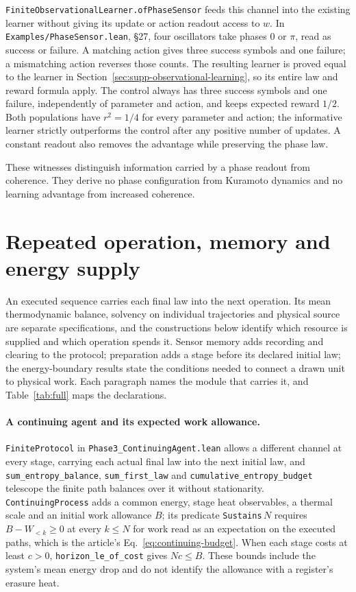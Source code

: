\documentclass{article}
\begin{document}
\texttt{FiniteObservationalLearner.ofPhaseSensor} feeds this channel into the
existing learner without giving its update or action readout access to $w$.
In \nolinkurl{Examples/PhaseSensor.lean}, \S27, four oscillators take
phases $0$ or $\pi$, read as success or failure. A matching action gives three
success symbols and one failure; a mismatching action reverses those counts.
The resulting learner is proved equal to the learner in
Section~\ref{sec:supp-observational-learning}, so its entire law and reward
formula apply. The control always has three success symbols and one failure,
independently of parameter and action, and keeps expected reward $1/2$.
Both populations have $r^2=1/4$ for every parameter and action; the informative
learner strictly outperforms the control after any positive number of updates.
A constant readout also removes the advantage while preserving the phase law.

These witnesses distinguish information carried by a phase readout from
coherence. They derive no phase configuration from Kuramoto dynamics and no
learning advantage from increased coherence.

\section{Repeated operation, memory and energy supply}
\label{sec:supp-resources}

An executed sequence carries each final law into the next operation. Its mean thermodynamic balance, solvency on individual trajectories and physical source are separate specifications, and the constructions below identify which resource is supplied and which operation spends it. Sensor memory adds recording and clearing to the protocol; preparation adds a stage before its declared initial law; the energy-boundary results state the conditions needed to connect a drawn unit to physical work. Each paragraph names the module that carries it, and Table~\ref{tab:full} maps the declarations.

\paragraph{A continuing agent and its expected work allowance.}
\texttt{FiniteProtocol} in \nolinkurl{Phase3_ContinuingAgent.lean}
allows a different channel at every stage, carrying each actual final law into
the next initial law, and \nolinkurl{sum_entropy_balance},
\nolinkurl{sum_first_law} and
\nolinkurl{cumulative_entropy_budget} telescope the finite
path balances over it without stationarity. \texttt{ContinuingProcess} adds a
common energy, stage heat observables, a thermal scale and an initial work
allowance $B$; its predicate \texttt{Sustains}$\,N$ requires $B-W_{<k}\geq0$ at
every $k\leq N$ for work read as an expectation on the executed paths, which is
the article's Eq.~\eqref{eq:continuing-budget}. When each stage costs at least
$c>0$, \nolinkurl{horizon_le_of_cost} gives
$Nc\leq B$. These bounds include the system's mean energy drop and do not
identify the allowance with a register's erasure heat.
\end{document}
